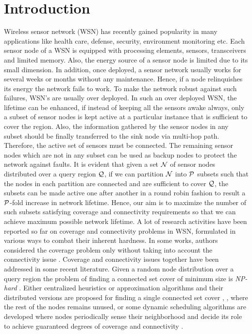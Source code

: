 \documentclass{acm_proc_article-sp}
\begin{document}
\section{Introduction}
\label{sec_1}
Wireless sensor network (WSN) has recently gained popularity in many applications like health care, defense, security, environment monitoring etc. Each sensor node of a WSN is equipped with processing elements, sensors, transceivers and limited memory. Also, the energy source of a sensor node is limited due to its small dimension. In addition, once deployed, a sensor network usually works for several weeks or months without any maintenance. Hence, if a node relinquishes its energy the network fails to work. To make the network robust against such failures, WSN's are usually over deployed. In such an over deployed WSN, the lifetime can be enhanced, if instead of keeping all the sensors awake always, only a subset of sensor nodes is kept active at a particular instance that is sufficient to cover the region. Also, the information gathered by the sensor nodes in any subset should be finally transferred to the sink node via multi-hop path. Therefore, the active set of sensors must be connected. The remaining 
sensor nodes which are not in any subset can be used as backup nodes to protect the network against faults. It is evident that given a set $\cal N $ of sensor nodes distributed over a query region $\cal Q $, if we can partition $\cal N $ into $\cal P $ subsets such that the nodes in each partition are connected and are sufficient to cover $\cal Q $, the subsets can be made active one after another in a round robin fashion to result a $\cal P$-fold increase in network lifetime. Hence, our aim is to maximize the number of such subsets satisfying coverage and connectivity requirements so that  we can achieve maximum possible network lifetime.
A lot of research activities have been reported so far on coverage and connectivity problems in WSN, formulated in various ways to combat their inherent hardness. In some works, authors considered the coverage problem only without taking into account the connectivity issue \cite{Zabrams, Huang,Meguerdichian, SSlij,Demin}. Coverage and connectivity issues together have been addressed in some recent literature. Given a random node distribution over a query region the problem of finding a connected set cover of minimum size is {\it NP-hard} \cite{Wang}. Either centralized heuristics or approximation algorithms and their distributed versions are proposed for finding a single connected set cover \cite{Himangsu}, \cite{Zhou}, where the rest of the nodes remains unused, or some dynamic scheduling algorithms are developed where nodes periodically sense their neighborhood and decide its role to achieve guaranteed degrees of coverage and connectivity \cite{Gallais,Lin,Chong,Tian,Wang,yan}.\\
\end{document}
